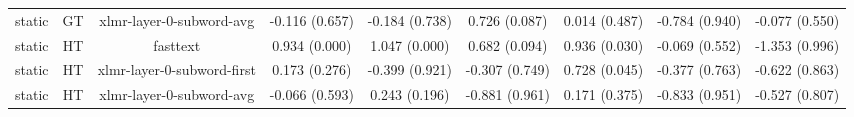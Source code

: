 \begin{sidewaystable}[htb]
\begin{tabular}{@{}ccccccccc@{}}
        static & GT & xlmr-layer-0-subword-avg & -0.116 (0.657) & -0.184 (0.738) & 0.726 (0.087) & 0.014 (0.487) & -0.784 (0.940) & -0.077 (0.550) \\
        static & HT & fasttext & 0.934 (0.000) & 1.047 (0.000) & 0.682 (0.094) & 0.936 (0.030) & -0.069 (0.552) & -1.353 (0.996) \\
        static & HT & xlmr-layer-0-subword-first & 0.173 (0.276) & -0.399 (0.921) & -0.307 (0.749) & 0.728 (0.045) & -0.377 (0.763) & -0.622 (0.863) \\
        static & HT & xlmr-layer-0-subword-avg & -0.066 (0.593) & 0.243 (0.196) & -0.881 (0.961) & 0.171 (0.375) & -0.833 (0.951) & -0.527 (0.807) \\
        \bottomrule
    \end{tabular}
\end{sidewaystable}
